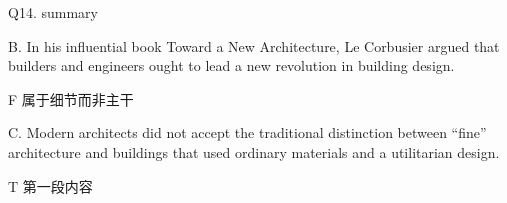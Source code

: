 \begin{blk}
    \begin{qst}
        Q14. summary
    \end{qst}

    \begin{chc}
        B. In his influential book Toward a New Architecture, Le Corbusier argued that builders and engineers ought to lead a new revolution in building design.
    \end{chc}

    \begin{nlz}
        F 属于细节而非主干
    \end{nlz}

    \begin{chc}
        C. Modern architects did not accept the traditional distinction between “fine” architecture and buildings that used ordinary materials and a utilitarian design.
    \end{chc}

    \begin{nlz}
        T 第一段内容
    \end{nlz}
\end{blk}
